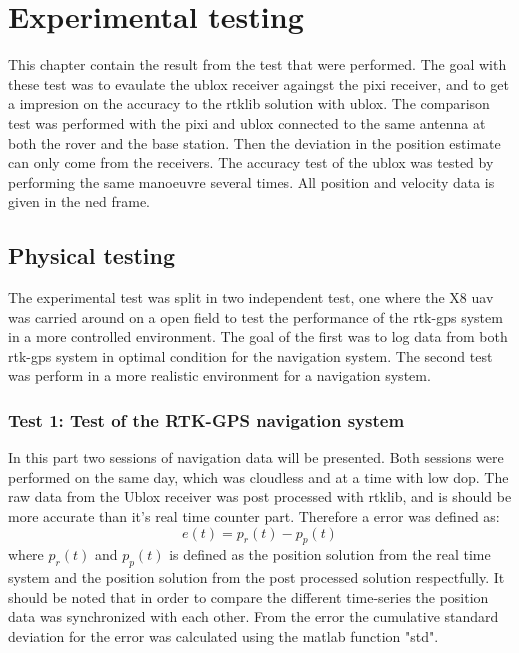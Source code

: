 
\chapter{Experimental testing}
This chapter contain the result from the test that were performed. The goal with these test was to evaulate the ublox receiver againgst the pixi receiver, and to get a impresion on the accuracy to the rtklib solution with ublox. The comparison test was performed with the pixi and ublox connected to the same antenna at both the rover and the base station. Then the deviation in the position estimate can only come from the receivers. The accuracy test of the ublox was tested by performing the same manoeuvre several times. All position and velocity data is given in the \gls{ned} frame. 
\section{Physical testing}
The experimental test was split in two independent test, one where the X8 \gls{uav} was carried around on a open field to test the performance of the \gls{rtk-gps} system in a more controlled environment. The goal of the first was to log data from both \gls{rtk-gps} system in optimal condition for the navigation system. The second test was perform in a more realistic environment for a navigation system. 


\subsection{Test 1: Test of the RTK-GPS navigation system}
In this part two sessions of navigation data will be presented. Both sessions were performed on the same day, which was cloudless and at a time with low \gls{dop}. The raw data from the Ublox receiver was post processed with rtklib, and is should be more accurate than it's real time counter part. Therefore a error was defined as:
\begin{equation}
e(t) = p_r(t) - p_p(t)
\end{equation}
where $p_r(t)$ and $p_p(t)$ is defined as the position solution from the real time system and the position solution from the post processed solution respectfully. It should be noted that in order to compare the different time-series the position data was synchronized with each other. From the error the cumulative standard deviation for the error was calculated using the matlab function "std".
